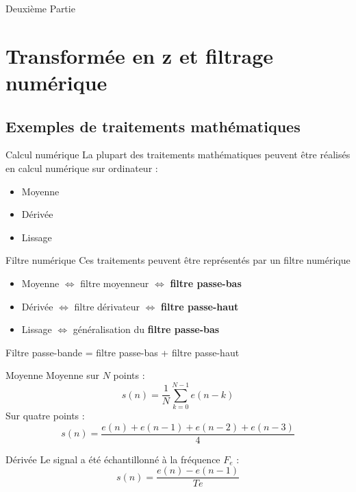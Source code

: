\documentclass{beamer}
\begin{document}
\begin{frame}{Deuxième Partie}
	\tableofcontents
\end{frame}

\section{Transformée en z et filtrage numérique}
\subsection{Exemples de traitements mathématiques}

\begin{frame}
\begin{block}{Calcul numérique}
\justify La plupart des traitements mathématiques peuvent être réalisés en
calcul numérique sur ordinateur :
\begin{itemize}
  \item Moyenne
  \item Dérivée
  \item Lissage
\end{itemize}
\end{block}
\pause
\begin{block}{Filtre numérique}
Ces traitements peuvent être représentés par un filtre numérique
\begin{itemize}
  \item Moyenne $\Leftrightarrow$ filtre moyenneur $\Leftrightarrow$
  \textbf{filtre passe-bas}
  \item Dérivée $\Leftrightarrow$ filtre dérivateur $\Leftrightarrow$
  \textbf{filtre passe-haut}
  \item Lissage $\Leftrightarrow$ généralisation du \textbf{filtre passe-bas}
\end{itemize}
\center
\alert{Filtre passe-bande = filtre passe-bas + filtre passe-haut}
\end{block}
\end{frame}

\begin{frame}
\begin{block}{Moyenne}
\justify Moyenne sur $N$ points :
$$
s(n) = \frac{1}{N}\sum_{k=0}^{N-1}e(n-k)
$$
Sur quatre points :
$$
s(n) = \frac{e(n) + e(n-1) + e(n-2) + e(n-3)}{4}
$$
\end{block}
\pause
\begin{block}{Dérivée}
Le signal a été échantillonné à la fréquence $F_e$ :
$$
s(n) = \frac{e(n) - e(n-1)}{Te}
$$
\end{block}
\end{frame}
\end{document}
